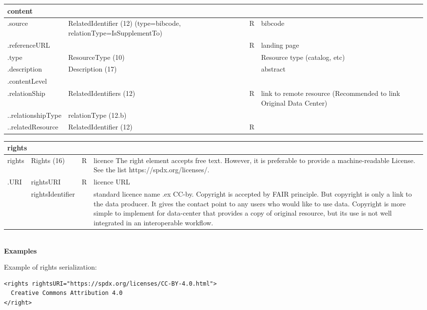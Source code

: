 \documentclass[11pt,a4paper]{ivoa}
\begin{document}
\begin{tabular}{|p{3cm}|p{4cm}|p{1cm}|p{5cm}|} \hline
\multicolumn{4}{|l|}{\textbf{content} } \\ \hline
.source        & RelatedIdentifier (12) (type=bibcode, relationType=IsSupplementTo) & R & bibcode\\ \hline
.referenceURL  & & R & landing page\\ \hline
.type          & ResourceType (10)& & Resource type (catalog, etc)\\ \hline
.description   & Description (17)& & abstract\\ \hline
.contentLevel  & & &\\ \hline
.relationShip  & RelatedIdentifiers (12) & R &link to remote resource (Recommended to link Original Data Center) \\ \hline
..relationshipType & relationType (12.b) & &\\ \hline
..relatedResource  & RelatedIdentifier (12) & R &\\ \hline
\end{tabular}

\begin{tabular}{|p{3cm}|p{4cm}|p{1cm}|p{5cm}|} \hline
\multicolumn{4}{|l|}{\textbf{rights}} \\ \hline
rights   & Rights (16)& R& licence
          The right element accepts free text. However, it is preferable to provide a machine-readable License. See the list https://spdx.org/licenses/.
         \\ \hline
.URI     & rightsURI & R& licence URL\\ \hline
         & rightsIdentifier & & standard licence name .ex CC-by.
         Copyright is accepted by FAIR principle. But copyright is only a link to the data producer. It gives the contact point to any users who would like to use data. Copyright is more simple to implement for data-center that provides a copy of original resource, but its use is not well integrated in an interoperable workflow.
         \\ \hline

\end{tabular}\\




\textbf{Examples}

Example of rights serialization:
\begin{verbatim}
<rights rightsURI="https://spdx.org/licenses/CC-BY-4.0.html">
  Creative Commons Attribution 4.0
</right>
\end{verbatim}
\end{document}

